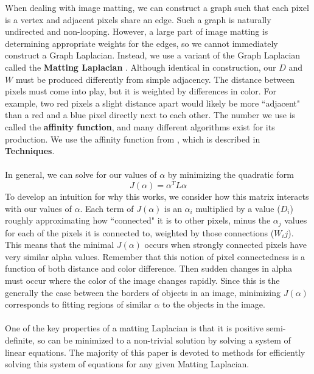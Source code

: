 When dealing with image matting, we can construct a graph such that each pixel is a vertex and adjacent pixels share an edge. Such a graph is naturally undirected and non-looping. However, a large part of image matting is determining appropriate weights for the edges, so we cannot immediately construct a Graph Laplacian. Instead, we use a variant of the Graph Laplacian called the \textbf{Matting Laplacian} \cite{levin08}.
Although identical in construction, our $D$ and $W$ must be produced differently from simple adjacency. The distance between pixels must come into play, but it is weighted by differences in color. For example, two red pixels a slight distance apart would likely be more ``adjacent" than a red and a blue pixel directly next to each other. The number we use is called the \textbf{affinity function}, and many different algorithms exist for its production. We use the affinity function from \cite{levin08}, which is described in \textbf{Techniques}.
\\\\
In general, we can solve for our values of $\alpha$ by minimizing the quadratic form
\[J(\alpha)=\alpha^T L\alpha\]
To develop an intuition for why this works, we consider how this matrix interacts with our values of $\alpha$. Each term of $J(\alpha)$ is an $\alpha_i$ multiplied by a value ($D_i$) roughly approximating how ``connected" it is to other pixels, minus the $\alpha_j$ values for each of the pixels it is connected to, weighted by those connections ($W_ij$). This means that the minimal $J(\alpha)$ occurs when strongly connected pixels have very similar alpha values. Remember that this notion of pixel connectedness is a function of both distance and color difference. Then sudden changes in alpha must occur where the color of the image changes rapidly. Since this is the generally the case between the borders of objects in an image, minimizing $J(\alpha)$ corresponds to fitting regions of similar $\alpha$ to the objects in the image.
\\\\
One of the key properties of a matting Laplacian is that it is positive semi-definite, so can be minimized to a non-trivial solution by solving a system of linear equations. The majority of this paper is devoted to methods for efficiently solving this system of equations for any given Matting Laplacian.